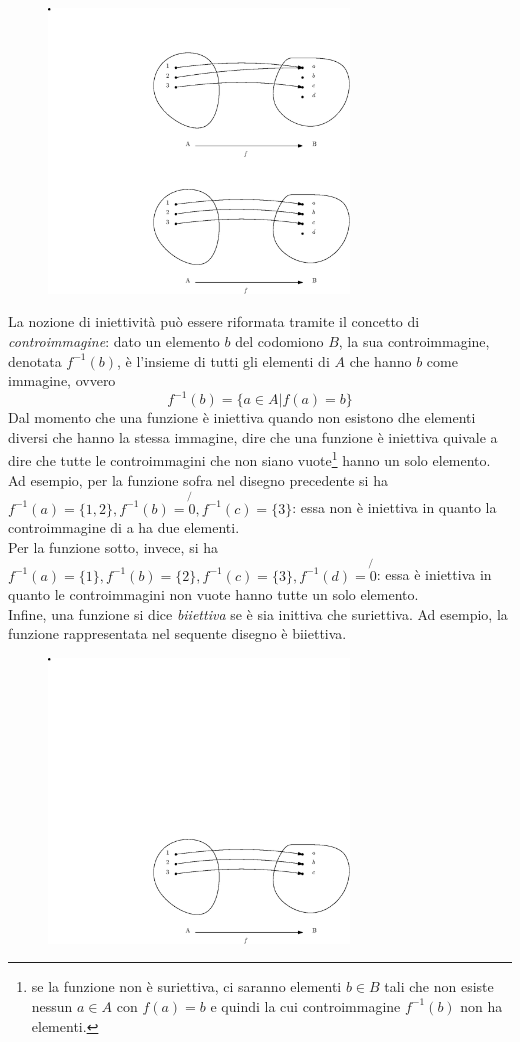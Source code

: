 \documentclass{book}
\begin{document}
\begin{figure}[th]
  \centering
  \includegraphics[width=8cm]{img/finiti/imgex4-4-2.eps}
\end{figure}

La nozione di iniettività può essere riformata tramite il concetto di \textit{controimmagine}:
dato un elemento $b$ del codomiono $B$, la sua controimmagine, denotata $f^{-1}(b)$, è l'insieme
di tutti gli elementi di $A$ che hanno $b$ come immagine, ovvero
\begin{equation*}
  f^{-1}(b)=\{a\in A|f(a)=b\}
\end{equation*}
Dal momento che una funzione è iniettiva quando non esistono dhe elementi diversi che hanno la
stessa immagine, dire che una funzione è iniettiva quivale a dire che tutte le controimmagini
che non siano vuote\footnote{se la funzione non è suriettiva, ci saranno elementi $b\in B$ tali
  che non esiste nessun $a\in A$ con $f(a)=b$ e quindi la cui controimmagine $f^{-1}(b)$ non ha
  elementi.} hanno un solo elemento.\\
Ad esempio, per la funzione sofra nel disegno precedente si ha $f^{-1}(a)=\{1,2\},f^{-1}(b)=
\not{0},f^{-1}(c)=\{3\}$: essa non è iniettiva in quanto la controimmagine di a ha due elementi.\\
Per la funzione sotto, invece, si ha $f^{-1}(a)=\{1\}, f^{-1}(b)=\{2\},f^{-1}(c)=\{3\},
f^{-1}(d)=\not{0}$: essa è iniettiva in quanto le controimmagini non vuote hanno tutte un solo
elemento.\\
Infine, una funzione si dice \textit{biiettiva} se è sia inittiva che suriettiva. Ad esempio,
la funzione rappresentata nel sequente disegno è biiettiva.
\begin{figure}[th]
  \centering
  \includegraphics[width=8cm]{img/finiti/imgex4-4-3.eps}
\end{figure}
\end{document}
